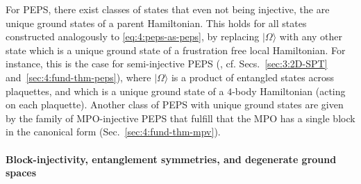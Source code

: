 \documentclass[rmp,aps,reprint,superscriptaddress,nobalancelastpage]{revtex4-1}
\newcommand{\ket}[1]{\vert#1\rangle}
\begin{document}
    For PEPS, there exist classes of states that even not being injective, the are unique ground states of a parent Hamiltonian. This holds for all states constructed analogously to \eqref{eq:4:peps-as-peps}, by replacing $\ket\Omega$ with any other state which is a unique ground state of a frustration free local Hamiltonian. For instance, this is the case for semi-injective PEPS (\textcite{molnar:quasi-injective-peps}, cf. Secs.~\ref{sec:3:2D-SPT} and~\ref{sec:4:fund-thm-peps}), where $\ket\Omega$ is a product of entangled states across plaquettes, and which is a unique ground state of a $4$-body Hamiltonian (acting on each plaquette).
    Another class of PEPS with unique ground states are given by the family of MPO-injective PEPS that fulfill that the MPO has a single block in the canonical form (Sec.~\ref{sec:4:fund-thm-mpv}).


    \paragraph{Block-injectivity, entanglement symmetries, and degenerate ground spaces}
\end{document}
